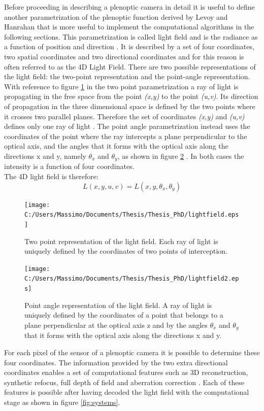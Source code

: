 Before proceeding in describing a plenoptic camera in detail it is useful to define another parametrization of the plenoptic function derived by Levoy and Hanrahan \cite{levoy1996light} that is more useful to implement the computational algorithms in the following sections. This parametrization is called light field and is the radiance as a function of position and direction \cite{levoy1996light}. It is described by a set of four coordinates, two spatial coordinates and two directional coordinates and for this reason is often referred to as the 4D Light Field. There are two possible representations of the light field: the two-point representation and the point-angle representation. With reference to figure \ref{fig:lightfield} in the two point parametrization a ray of light is propagating in the free space from the point \textit{(x,y)} to the point\textit{ (u,v)}. Its direction of propagation in the three dimensional space is defined by the two points where it crosses two parallel planes. Therefore the set of coordinates \textit{(x,y)} and \textit{(u,v)} defines only one ray of light \cite{levoy1996light}. The point angle parametrization instead uses the coordinates of the point where the ray intercepts a plane perpendicular to the optical axis, and the angles that it forms with the optical axis along the directions x and y, namely $\theta_x$  and $\theta_y$, as shown in figure \ref{fig:lightfield2} \cite{georgiev2006light}. In both cases the intensity is a function of four coordinates. \\ The 4D light field is therefore:
\begin{equation}
\label{eq:lightfield}
L(x,y,u,v) = L(x,y,\theta_x,\theta_y)
\end{equation}
\begin{figure}[H]
	\centering
	\texttt{[image: C:/Users/Massimo/Documents/Thesis/Thesis\_PhD/lightfield.eps]}
	\caption{\label{fig:lightfield}Two point representation of the light field. Each ray of light is uniquely defined by the coordinates of two points of interception.}
\end{figure}
\begin{figure}[H]
	\centering
	\texttt{[image: C:/Users/Massimo/Documents/Thesis/Thesis\_PhD/lightfield2.eps]}
	\caption{\label{fig:lightfield2}Point angle representation of the light field. A ray of light is uniquely defined by the coordinates of a point that belongs to a plane perpendicular at the optical axis z and by the angles $\theta_x$ and $\theta_y$ that it forms with the optical axis along the directions x and y.}
\end{figure}
For each pixel of the sensor of a plenoptic camera it is possible to determine these four coordinates. The information provided by the two extra directional coordinates enables a set of computational features such as 3D reconstruction, synthetic refocus, full depth of field and aberration correction \cite{ng2006digital}. Each of these features is possible after having decoded the light field with the computational stage as shown in figure \ref{fig:systems}.
